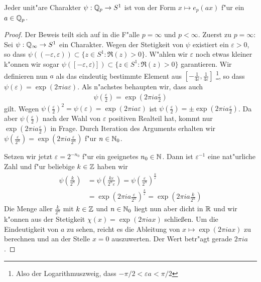 		
		\begin{lemma}
			Jeder unit"are Charakter $\psi: {\mathbb{Q}_p} \to S^1$ ist von der Form $x \mapsto e_p(ax)$ f"ur ein $a \in {\mathbb{Q}_p}$.
		\end{lemma}
		\begin{proof}
			Der Beweis teilt sich auf in die F"alle $p=\infty$ und $p<\infty$.
			Zuerst zu $p=\infty$: Sei $\psi: \mathbb{Q}_\infty \to S^1$ ein Charakter.
			Wegen der Stetigkeit von $\psi$ existiert ein $\varepsilon > 0$, so dass $\psi((-\varepsilon, \varepsilon)) \subset \{z\in S^1: \Re(z)>0\}$.
			W"ahlen wir $\varepsilon$ noch etwas kleiner k"onnen wir sogar $\psi([-\varepsilon, \varepsilon)]) \subset \{z\in S^1: \Re(z)>0\}$ garantieren.
			Wir definieren nun $a$ als das eindeutig bestimmte Element aus $[-\frac{1}{4\varepsilon},\frac{1}{4\varepsilon}]$
			\footnote{Also der Logarithmuszweig, dass $-\pi/2<\varepsilon a<\pi/2$}, so dass $\psi (\varepsilon) = \exp(2\pi i a \varepsilon)$.
			Als n"achstes behaupten wir, dass auch
			\begin{align*}
				\psi \left(\frac{\varepsilon}{2}\right) =  \exp\left(2\pi i  a \frac{\varepsilon}{2}\right)
			\end{align*}
			gilt.
			Wegen $\psi (\frac{\varepsilon}{2})^2 = \psi (\varepsilon) = \exp(2\pi i a \varepsilon)$ ist $\psi (\frac{\varepsilon}{2}) = \pm \exp(2\pi i  a \frac{\varepsilon}{2})$.
			Da aber $\psi (\frac{\varepsilon}{2})$ nach der Wahl von $\varepsilon$ positiven Realteil hat, kommt nur $ \exp(2\pi i  a \frac{\varepsilon}{2})$ in Frage.
			Durch Iteration des Arguments erhalten wir $\psi (\frac{\varepsilon}{2^n}) = \exp(2\pi i  a \frac{\varepsilon}{2^n})$ f"ur $n\in \mathbb{N}_0$.
			
			Setzen wir jetzt $\varepsilon = 2^{-n_0}$ f"ur ein geeignetes  $n_0\in\mathbb{N}$.
			Dann ist $\varepsilon^{-1}$ eine nat"urliche Zahl und f"ur beliebige $k\in\mathbb{Z}$ haben wir
			\begin{align*}
				\psi \left(\frac{k} {2^{n}}\right) &= \psi \left(\frac{k\varepsilon} {2^{n}\varepsilon}\right) 
										= \psi \left(\frac{\varepsilon} {2^{n}}\right) ^{\frac{k}{\varepsilon}} 
										\\&= \exp\left(2\pi i  a \frac{\varepsilon}{2^n}\right) ^{\frac{k}{\varepsilon}}
										= \exp\left(2\pi i  a \frac{k}{2^n}\right)
			\end{align*}
			Die Menge aller $\frac{k}{2^n}$ mit $k\in \mathbb{Z}$ und $n\in \mathbb{N}_0$ liegt nun aber dicht in $\mathbb{R}$ und wir k"onnen aus der Stetigkeit $\chi(x) = \exp(2\pi i a x)$ schließen.
			Um die Eindeutigkeit von $a$ zu sehen, reicht es die Ableitung  von $x \mapsto \exp(2\pi i a x)$ zu berechnen und an der Stelle $x=0$ auszuwerten.
			Der Wert betr"agt gerade $2\pi i a$.
			

\end{proof}
